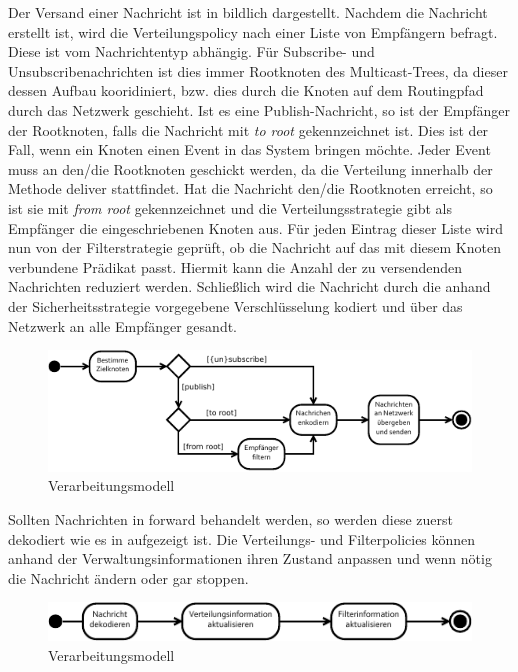 Der Versand einer Nachricht ist in  bildlich dargestellt. Nachdem die Nachricht erstellt ist, wird die Verteilungspolicy nach einer Liste von Empfängern befragt. Diese ist vom Nachrichtentyp abhängig. Für Subscribe- und Unsubscribenachrichten ist dies immer Rootknoten des Multicast-Trees, da dieser dessen Aufbau kooridiniert, bzw. dies durch die Knoten auf dem Routingpfad durch das Netzwerk geschieht. Ist es eine Publish-Nachricht, so ist der Empfänger der Rootknoten, falls die Nachricht mit \emph{to root} gekennzeichnet ist. Dies ist der Fall, wenn ein Knoten einen Event in das System bringen möchte. Jeder Event muss an den/die Rootknoten geschickt werden, da die Verteilung innerhalb der Methode deliver stattfindet. Hat die Nachricht den/die Rootknoten erreicht, so ist sie mit \emph{from root} gekennzeichnet und die Verteilungsstrategie gibt als Empfänger die eingeschriebenen Knoten aus. Für jeden Eintrag dieser Liste wird nun von der Filterstrategie geprüft, ob die Nachricht auf das mit diesem Knoten verbundene Prädikat passt. Hiermit kann die Anzahl der zu versendenden Nachrichten reduziert werden. Schließlich wird die Nachricht durch die anhand der Sicherheitsstrategie vorgegebene Verschlüsselung kodiert und über das Netzwerk an alle Empfänger gesandt.

\begin{figure}[htbp]
\centering
\includegraphics{grafics/processing_send.pdf}
\caption{Verarbeitungsmodell}
\label{fig:processing_send}
\end{figure}

Sollten Nachrichten in forward behandelt werden, so werden diese zuerst dekodiert wie es in  aufgezeigt ist. Die Verteilungs- und Filterpolicies können anhand der Verwaltungsinformationen ihren Zustand anpassen und wenn nötig die Nachricht ändern oder gar stoppen.

\begin{figure}[htbp]
\centering
\includegraphics{grafics/processing_forward.pdf}
\caption{Verarbeitungsmodell}
\label{fig:processing_forward}
\end{figure}

